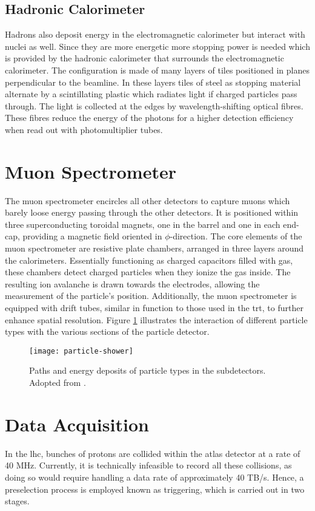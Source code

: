 \subsection{Hadronic Calorimeter}

Hadrons also deposit energy in the electromagnetic calorimeter but interact with nuclei as well. Since they are more energetic more stopping power is needed which is provided by the hadronic calorimeter that surrounds the electromagnetic calorimeter. The configuration is made of many layers of tiles positioned in planes perpendicular to the beamline. In these layers tiles of steel as stopping material alternate by a scintillating plastic which radiates light if charged particles pass through. The light is collected at the edges by wavelength-shifting optical fibres. These fibres reduce the energy of the photons for a higher detection efficiency when read out with photomultiplier tubes.

\section{Muon Spectrometer}

The muon spectrometer encircles all other detectors to capture muons which barely loose energy passing through the other detectors. It is positioned within three superconducting toroidal magnets, one in the barrel and one in each end-cap, providing a magnetic field oriented in $\phi$-direction. The core elements of the muon spectrometer are resistive plate chambers, arranged in three layers around the calorimeters. Essentially functioning as charged capacitors filled with gas, these chambers detect charged particles when they ionize the gas inside. The resulting ion avalanche is drawn towards the electrodes, allowing the measurement of the particle's position. Additionally, the muon spectrometer is equipped with drift tubes, similar in function to those used in the \ac{trt}, to further enhance spatial resolution. Figure \ref{fig:particles_in_detector} illustrates the interaction of different particle types with the various sections of the particle detector.
\begin{figure}
    \centering
    \texttt{[image: particle-shower]}
    \caption[]{Paths and energy deposits of particle types in the subdetectors. Adopted from \citep{Guth:2765038}.}
    \label{fig:particles_in_detector}
\end{figure}

\section{Data Acquisition}\label{sec:tdaq}
In the \ac{lhc}, bunches of protons are collided within the \ac{atlas} detector at a rate of 40 MHz. Currently, it is technically infeasible to record all these collisions, as doing so would require handling a data rate of approximately 40 TB/s. Hence, a preselection process is employed known as triggering, which is carried out in two stages.

